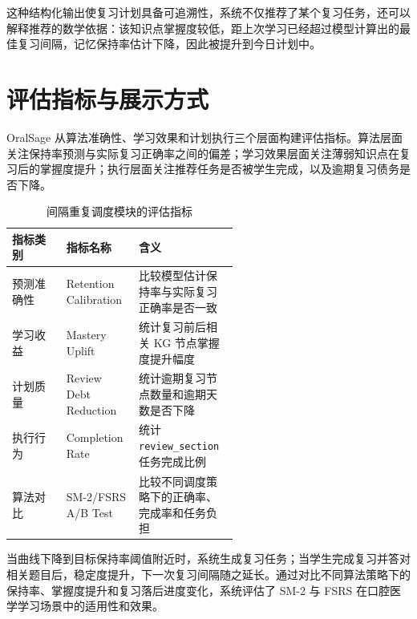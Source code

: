 这种结构化输出使复习计划具备可追溯性，系统不仅推荐了某个复习任务，还可以解释推荐的数学依据：该知识点掌握度较低，距上次学习已经超过模型计算出的最佳复习间隔，记忆保持率估计下降，因此被提升到今日计划中。

\section{评估指标与展示方式}

OralSage 从算法准确性、学习效果和计划执行三个层面构建评估指标。算法层面关注保持率预测与实际复习正确率之间的偏差；学习效果层面关注薄弱知识点在复习后的掌握度提升；执行层面关注推荐任务是否被学生完成，以及逾期复习债务是否下降。

\begin{table}[H]
  \centering
  \caption{间隔重复调度模块的评估指标}
  \label{tab:spaced-review-evaluation}
  \begin{tabularx}{\linewidth}{p{0.24\linewidth}p{0.32\linewidth}X}
    \toprule
    指标类别 & 指标名称 & 含义 \\
    \midrule
    预测准确性 & Retention Calibration & 比较模型估计保持率与实际复习正确率是否一致 \\
    学习收益 & Mastery Uplift & 统计复习前后相关 KG 节点掌握度提升幅度 \\
    计划质量 & Review Debt Reduction & 统计逾期复习节点数量和逾期天数是否下降 \\
    执行行为 & Completion Rate & 统计 \texttt{review\_section} 任务完成比例 \\
    算法对比 & SM-2/FSRS A/B Test & 比较不同调度策略下的正确率、完成率和任务负担 \\
    \bottomrule
  \end{tabularx}
\end{table}

当曲线下降到目标保持率阈值附近时，系统生成复习任务；当学生完成复习并答对相关题目后，稳定度提升，下一次复习间隔随之延长。通过对比不同算法策略下的保持率、掌握度提升和复习落后进度变化，系统评估了 SM-2 与 FSRS 在口腔医学学习场景中的适用性和效果。

